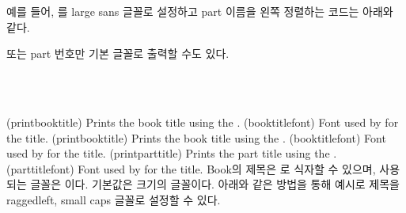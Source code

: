 예를 들어, \cmd{\part}를 large sans 글꼴로 설정하고 part 이름을 왼쪽 정렬하는
코드는 아래와 같다.
\begin{lcode}
\renewcommand{\partnamefont}{\normalfont\huge\sffamily\raggedright}
\renewcommand{\partnumfont}{\normalfont\huge\sffamily}
\end{lcode}
또는 part 번호만 기본 글꼴로 출력할 수도 있다.
\begin{lcode}
\renewcommand{\printpartname}{}
\renewcommand{\partnamenum}{}
\end{lcode}


\begin{syntax}
\cmd{\printbooktitle} \cmd{\booktitlefont} \\
\cmd{\printparttitle} \cmd{\parttitlefont} \\
\end{syntax}
\glossary(printbooktitle)%
  {}%
  {Prints the book title using the .}
\glossary(booktitlefont)%
  {}%
  {Font used by  for the title.}
\glossary(printbooktitle)%
  {}%
  {Prints the book title using the .}
\glossary(booktitlefont)%
  {}%
  {Font used by  for the title.}
\glossary(printparttitle)%
  {}%
  {Prints the part title using the .}
\glossary(parttitlefont)%
  {}%
  {Font used by  for the title.}
Book의 제목은 \cmd{\printbooktitle}로 식자할 수 있으며, 사용되는 글꼴은
\cmd{\booktitlefont}이다.
기본값은 \cmd{\Huge} 크기의 \cmd{\bfseries} 글꼴이다. 아래와 같은 방법을 통해
예시로 제목을 raggedleft, small caps 글꼴로 설정할 수 있다.
\begin{lcode}
\renewcommand{\booktitlefont}{\normalfont\Huge\scshape\raggedleft}
\end{lcode}


